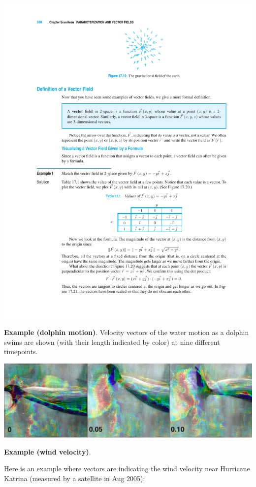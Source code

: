 \documentclass[12pt,letterpaper,noanswers]{exam}
\begin{document}
\includegraphics{img/N24_p4.pdf}

\vspace{0.1cm}

\noindent\textbf{Example (dolphin motion)}.
Velocity vectors of the water motion as a dolphin swims are shown (with their length indicated by color) at nine different timepoints.

\includegraphics[width=0.8\linewidth]{img/C24p1b-18.png}

\cite{fish2014measurement}
\vfill




\noindent\textbf{Example (wind velocity)}.

Here is an example where vectors are indicating the wind velocity near Hurricane Katrina (measured by a satellite in Aug 2005):
\end{document}
